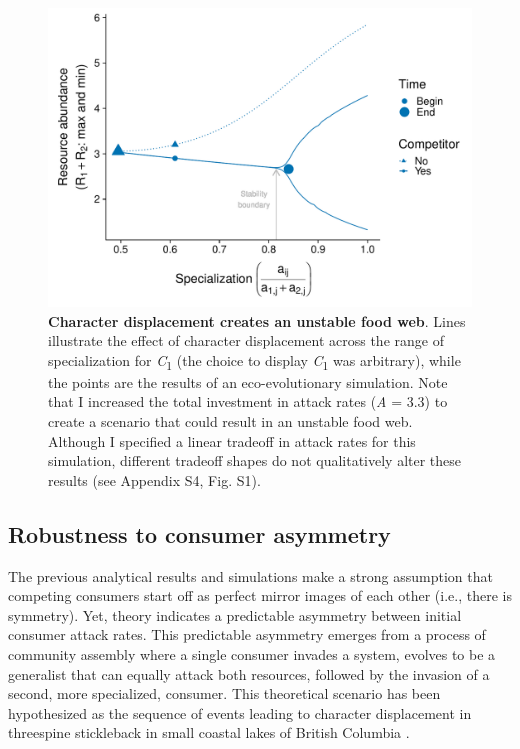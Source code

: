 \documentclass[11pt,]{article}
\begin{document}
\begin{figure}
\centering
\includegraphics{Fig_4_Bifurcation.pdf}
\caption{\label{fig:bifur_plot}\textbf{Character displacement creates an
unstable food web}. Lines illustrate the effect of character
displacement across the range of specialization for
\emph{C}\textsubscript{1} (the choice to display
\emph{C}\textsubscript{1} was arbitrary), while the points are the
results of an eco-evolutionary simulation. Note that I increased the
total investment in attack rates (\emph{A} = 3.3) to create a scenario
that could result in an unstable food web. Although I specified a linear
tradeoff in attack rates for this simulation, different tradeoff shapes
do not qualitatively alter these results (see Appendix S4, Fig. S1).}
\end{figure}

\subsection{Robustness to consumer
asymmetry}\label{robustness-to-consumer-asymmetry}

The previous analytical results and simulations make a strong assumption
that competing consumers start off as perfect mirror images of each
other (i.e., there is symmetry). Yet, theory indicates a predictable
asymmetry between initial consumer attack rates. This predictable
asymmetry emerges from a process of community assembly where a single
consumer invades a system, evolves to be a generalist that can equally
attack both resources, followed by the invasion of a second, more
specialized, consumer. This theoretical scenario has been hypothesized
as the sequence of events leading to character displacement in
threespine stickleback in small coastal lakes of British Columbia
\citep{Schluter1992, Schluter2000}.
\end{document}
